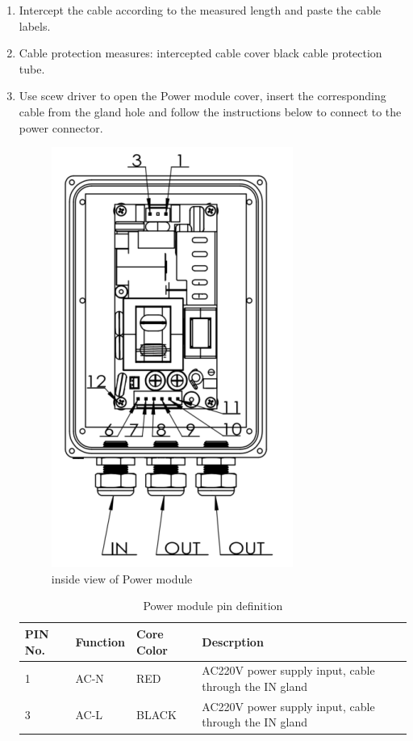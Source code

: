 \documentclass{article}
\begin{document}
\begin{enumerate}
\begin{enumerate}
    \end{enumerate}
    \item Intercept the cable according to the measured length and paste the cable labels.
    \item Cable protection measures: intercepted cable cover black cable protection tube.
    \item Use scew driver to open the Power module cover, insert the corresponding cable from the gland hole and follow the instructions below to connect to the power connector.
    \begin{figure}[H]
        \centering
        \includegraphics{Power module open B.png}
        \caption{inside view of Power module}
    \end{figure}
    \begin{table}[htbp]
        \centering
        \caption{Power module pin definition}
        \begin{tabular}{|p{2cm}|p{3cm}|p{2cm}|p{6cm}|}
            \hline
            \toprule
            PIN No. & Function & Core Color & Descrption \\
            \midrule
            1 & AC-N & RED & AC220V power supply input, cable through the IN gland\\ \hline
            3 & AC-L & BLACK & AC220V power supply input, cable through the IN gland\\ \hline

\end{tabular}
\end{table}
\end{enumerate}
\end{document}
